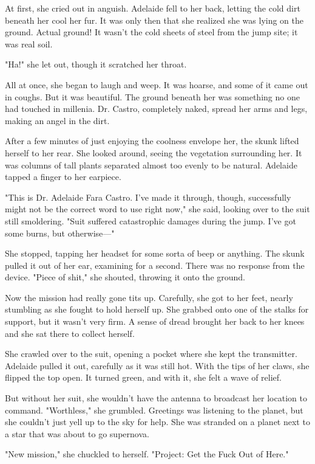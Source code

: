 At first, she cried out in anguish. Adelaide fell to her back, letting the cold dirt beneath her cool her fur. It was only then that she realized she was lying on the ground. Actual ground! It wasn't the cold sheets of steel from the jump site; it was real soil.

"Ha!" she let out, though it scratched her throat.

All at once, she began to laugh and weep. It was hoarse, and some of it came out in coughs. But it was beautiful. The ground beneath her was something no one had touched in millenia. Dr. Castro, completely naked, spread her arms and legs, making an angel in the dirt.

After a few minutes of just enjoying the coolness envelope her, the skunk lifted herself to her rear. She looked around, seeing the vegetation surrounding her. It was columns of tall plants separated almost too evenly to be natural. Adelaide tapped a finger to her earpiece.

"This is Dr. Adelaide Fara Castro. I've made it through, though, successfully might not be the correct word to use right now," she said, looking over to the suit still smoldering. "Suit suffered catastrophic damages during the jump. I've got some burns, but otherwise---"

She stopped, tapping her headset for some sorta of beep or anything. The skunk pulled it out of her ear, examining for a second. There was no response from the device. "Piece of shit," she shouted, throwing it onto the ground.

Now the mission had really gone tits up. Carefully, she got to her feet, nearly stumbling as she fought to hold herself up. She grabbed onto one of the stalks for support, but it wasn't very firm. A sense of dread brought her back to her knees and she sat there to collect herself.

She crawled over to the suit, opening a pocket where she kept the transmitter. Adelaide pulled it out, carefully as it was still hot. With the tips of her claws, she flipped the top open. It turned green, and with it, she felt a wave of relief.

But without her suit, she wouldn't have the antenna to broadcast her location to command. "Worthless," she grumbled. Greetings was listening to the planet, but she couldn't just yell up to the sky for help. She was stranded on a planet next to a star that was about to go supernova.

"New mission," she chuckled to herself. "Project: Get the Fuck Out of Here."

